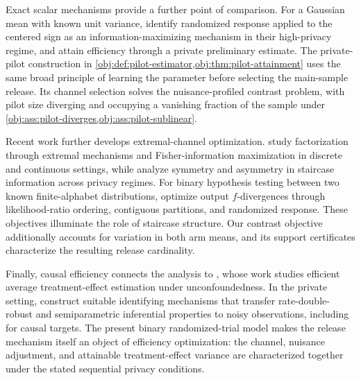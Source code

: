 Exact scalar mechanisms provide a further point of comparison. For a Gaussian mean with known unit variance, \citet{KalininSteinberger2025} identify randomized response applied to the centered sign as an information-maximizing mechanism in their high-privacy regime, and attain efficiency through a private preliminary estimate. %
The private-pilot construction in \cref{obj:def:pilot-estimator,obj:thm:pilot-attainment} uses the same broad principle of learning the parameter before selecting the main-sample release. Its channel selection solves the nuisance-profiled contrast problem, with pilot size diverging and occupying a vanishing fraction of the sample under \cref{obj:ass:pilot-diverges,obj:ass:pilot-sublinear}.

Recent work further develops extremal-channel optimization. \citet{Amorino2025} study factorization through extremal mechanisms and Fisher-information maximization in discrete and continuous settings, while \citet{Amorino2026} analyze symmetry and asymmetry in staircase information across privacy regimes. %
For binary hypothesis testing between two known finite-alphabet distributions, \citet{GhaziNasserCalmonIssa2026} optimize output \(f\)-divergences through likelihood-ratio ordering, contiguous partitions, and randomized response. %
These objectives illuminate the role of staircase structure. Our contrast objective additionally accounts for variation in both arm means, and its support certificates characterize the resulting release cardinality.

Finally, causal efficiency connects the analysis to \citet{Hahn1998,Hirano2003}, whose work studies efficient average treatment-effect estimation under unconfoundedness. %
In the private setting, \citet{KormosVanderVaart2026} construct suitable identifying mechanisms that transfer rate-double-robust and semiparametric inferential properties to noisy observations, including for causal targets. %
The present binary randomized-trial model makes the release mechanism itself an object of efficiency optimization: the channel, nuisance adjustment, and attainable treatment-effect variance are characterized together under the stated sequential privacy conditions.
